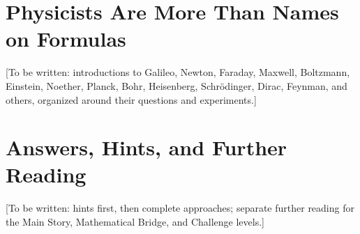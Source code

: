 \documentclass[fontset=fandol,12pt,openany]{ctexbook}
\begin{document}
\chapter{Physicists Are More Than Names on Formulas}
[To be written: introductions to Galileo, Newton, Faraday, Maxwell, Boltzmann, Einstein, Noether, Planck, Bohr, Heisenberg, Schrödinger, Dirac, Feynman, and others, organized around their questions and experiments.]
\chapter{Answers, Hints, and Further Reading}
[To be written: hints first, then complete approaches; separate further reading for the Main Story, Mathematical Bridge, and Challenge levels.]
\end{document}
